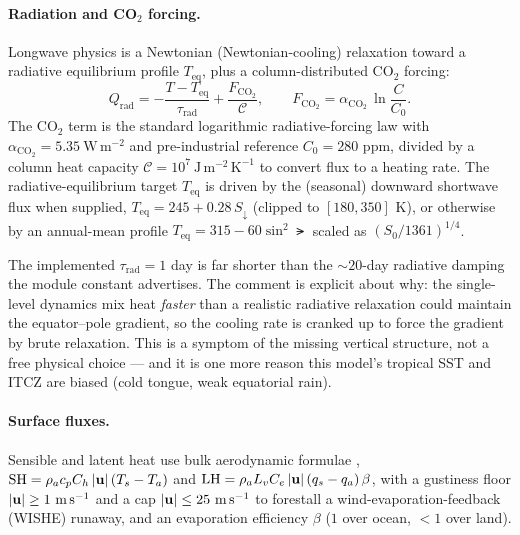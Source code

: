 
\paragraph{Radiation and CO$_2$ forcing.}
Longwave physics is a Newtonian (Newtonian-cooling) relaxation toward a radiative
equilibrium profile $T_{\mathrm{eq}}$, plus a column-distributed CO$_2$ forcing:
\begin{equation}
  Q_{\mathrm{rad}} = -\frac{T - T_{\mathrm{eq}}}{\tau_{\mathrm{rad}}}
                     + \frac{F_{\mathrm{CO_2}}}{\mathcal{C}},
  \qquad
  F_{\mathrm{CO_2}} = \alpha_{\mathrm{CO_2}}\,\ln\!\frac{C}{C_0}.
  \label{eq:rad}
\end{equation}
The CO$_2$ term is the standard logarithmic radiative-forcing law
\citep{myhre1998} with $\alpha_{\mathrm{CO_2}}=5.35\ \mathrm{W\,m^{-2}}$ and
pre-industrial reference $C_0=280$ ppm, divided by a column heat capacity
$\mathcal{C}=10^7\ \mathrm{J\,m^{-2}\,K^{-1}}$ to convert flux to a heating rate.
The radiative-equilibrium target $T_{\mathrm{eq}}$ is driven by the (seasonal)
downward shortwave flux when supplied, $T_{\mathrm{eq}}=245+0.28\,S_\downarrow$
(clipped to $[180,350]$ K), or otherwise by an annual-mean profile
$T_{\mathrm{eq}}=315-60\sin^2\!\lat$ scaled as $(S_0/1361)^{1/4}$.


\begin{remark}
The implemented $\tau_{\mathrm{rad}}=1$ day is far shorter than the $\sim 20$-day
radiative damping the module constant  advertises. The
comment is explicit about why: the single-level dynamics mix heat \emph{faster}
than a realistic radiative relaxation could maintain the equator--pole gradient, so
the cooling rate is cranked up to force the gradient by brute relaxation. This is a
symptom of the missing vertical structure, not a free physical choice --- and it is
one more reason this model's tropical SST and ITCZ are biased (cold tongue, weak
equatorial rain).
\end{remark}

\paragraph{Surface fluxes.}
Sensible and latent heat use bulk aerodynamic formulae \citep{largeyeager2004},
$\mathrm{SH}=\rho_a c_p C_h\,|\mathbf{u}|\,(T_s-T_a)$ and
$\mathrm{LH}=\rho_a L_v C_e\,|\mathbf{u}|\,(q_s-q_a)\,\beta$, with a gustiness floor
$|\mathbf{u}|\ge 1\ \mathrm{m\,s^{-1}}$ and a cap $|\mathbf{u}|\le 25\ \mathrm{m\,s^{-1}}$ to
forestall a wind-evaporation-feedback (WISHE) runaway, and an evaporation
efficiency $\beta$ ($1$ over ocean, $<1$ over land).

